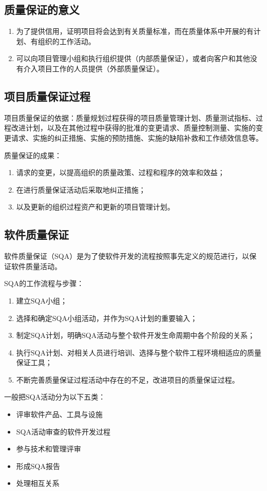 \subsection{质量保证的意义}
\begin{enumerate}
	\item 为了提供信用，证明项目将会达到有关质量标准，而在质量体系中开展的有计划、有组织的工作活动。
	\item 可以向项目管理小组和执行组织提供（内部质量保证），或者向客户和其他没有介入项目工作的人员提供（外部质量保证）。
\end{enumerate}
\subsection{项目质量保证过程}
项目质量保证的依据：质量规划过程获得的项目质量管理计划、质量测试指标、过程改进计划，以及在其他过程中获得的批准的变更请求、质量控制测量、实施的变更请求、实施的纠正措施、实施的预防措施、实施的缺陷补救和工作绩效信息等。
\par 质量保证的成果：
\begin{enumerate}
	\item 请求的变更，以提高组织的质量政策、过程和程序的效率和效益；
	\item 在进行质量保证活动后采取地纠正措施；
	\item 以及更新的组织过程资产和更新的项目管理计划。
\end{enumerate}
\subsection{软件质量保证}
软件质量保证（SQA）是为了使软件开发的流程按照事先定义的规范进行，以保证软件质量活动。
\par SQA的工作流程与步骤：
\begin{enumerate}
	\item 建立SQA小组；
	\item 选择和确定SQA小组活动，并作为SQA计划的重要输入；
	\item 制定SQA计划，明确SQA活动与整个软件开发生命周期中各个阶段的关系；
	\item 执行SQA计划、对相关人员进行培训、选择与整个软件工程环境相适应的质量保证工具；
	\item 不断完善质量保证过程活动中存在的不足，改进项目的质量保证过程。
\end{enumerate}
\par 一般把SQA活动分为以下五类：
\begin{itemize}
	\item 评审软件产品、工具与设施
	\item SQA活动审查的软件开发过程
	\item 参与技术和管理评审
	\item 形成SQA报告
	\item 处理相互关系
\end{itemize}
